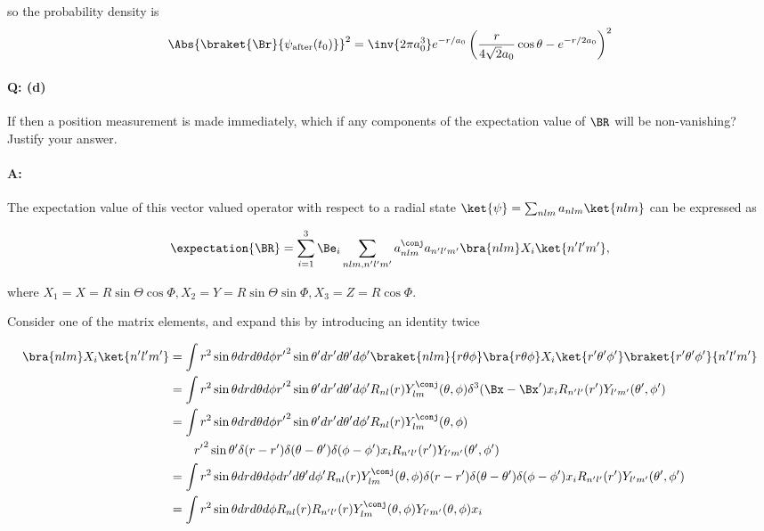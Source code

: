 {so the probability density is
\begin{equation}\label{eqn:qmIexamPractice2007Dec:4:300}
\Abs{\braket{\Br}{\psi_{\text{after}}(t_0)}}^2
= \inv{2 \pi a_0^3}
e^{-r/a_0} 
\left(
\frac{r}{4\sqrt{2} a_0} \cos\theta
-e^{-r/2 a_0}
\right)^2 
\end{equation}

\paragraph{Q: (d)}

If then a position measurement is made immediately, which if any components of the expectation value of \(\BR\) will be non-vanishing?  Justify your answer.

\paragraph{A:}

The expectation value of this vector valued operator with respect to a radial state \(\ket{\psi} = \sum_{nlm} a_{nlm} \ket{nlm}\) can be expressed as

\begin{equation}\label{eqn:qmIexamPractice2007Dec:4:400}
\expectation{\BR} = \sum_{i=1}^3 \Be_i \sum_{nlm, n'l'm'} 
a_{nlm}^\conj a_{n'l'm'} 
\bra{nlm} X_i
\ket{n'l'm'},
\end{equation}

where \(X_1 = X = R \sin\Theta \cos\Phi, X_2 = Y = R \sin\Theta \sin\Phi, X_3 = Z = R \cos\Phi\).

Consider one of the matrix elements, and expand this by introducing an identity twice

\begin{equation}\label{eqn:qmIexamPractice2007Dec:550}
\begin{aligned}
\bra{nlm} X_i \ket{n'l'm'}
&=
\int 
r^2 \sin\theta dr d\theta d\phi
{r'}^2 \sin\theta' dr' d\theta' d\phi'
\braket{nlm}{r \theta \phi} \bra{r \theta \phi} X_i \ket{r' \theta' \phi' }\braket{r' \theta' \phi'}{n'l'm'} \\
&=
\int 
r^2 \sin\theta dr d\theta d\phi
{r'}^2 \sin\theta' dr' d\theta' d\phi'
R_{nl}(r) Y_{lm}^\conj(\theta,\phi)
\delta^3(\Bx - \Bx') x_i
R_{n'l'}(r') Y_{l'm'}(\theta',\phi')
\\
&=
\int 
r^2 \sin\theta dr d\theta d\phi
{r'}^2 \sin\theta' dr' d\theta' d\phi'
R_{nl}(r) Y_{lm}^\conj(\theta,\phi) \\
&\qquad{r'}^2 \sin\theta' \delta(r-r') \delta(\theta - \theta') \delta(\phi-\phi')
x_i
R_{n'l'}(r') Y_{l'm'}(\theta',\phi')
\\
&=
\int 
r^2 \sin\theta dr d\theta d\phi
dr' d\theta' d\phi'
R_{nl}(r) Y_{lm}^\conj(\theta,\phi) 
\delta(r-r') \delta(\theta - \theta') \delta(\phi-\phi')
x_i
R_{n'l'}(r') Y_{l'm'}(\theta',\phi')
\\
&=
\int 
r^2 \sin\theta dr d\theta d\phi
R_{nl}(r) R_{n'l'}(r) 
Y_{lm}^\conj(\theta,\phi) Y_{l'm'}(\theta,\phi)
x_i
\\
\end{aligned}
\end{equation}

}
